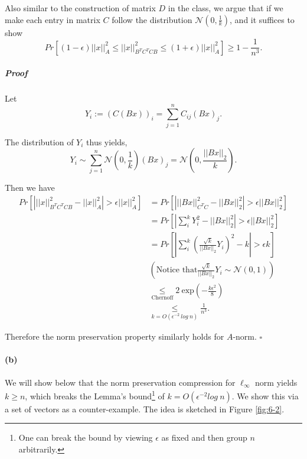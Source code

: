 \documentclass[12pt]{article}
\begin{document}
Also similar to the construction of matrix $D$ in the class, we argue that if we make each entry in matrix $C$ follow the distribution $\mathcal{N}(0, \frac{1}{k})$, and it suffices to show
\begin{equation*}
Pr\left[(1-\epsilon) ||x||^2_A \leq ||x||^2_{B^TC^TCB} \leq (1+\epsilon) ||x||^2_A\right] \geq 1 - \frac{1}{n^3}.
\end{equation*}

\subparagraph{Proof}
Let
\begin{equation*}
Y_i := \left(C(Bx)\right)_i = \sum_{j=1}^n C_{ij} (Bx)_j. 
\end{equation*}

The distribution of $Y_i$ thus yields,
\begin{equation*}
Y_i \sim \sum_{j=1}^n \mathcal{N}(0, \frac{1}{k}) (Bx)_j = \mathcal{N}(0, \frac{||Bx||_2}{k}). 
\end{equation*}

Then we have
\begin{align*}
Pr\left[\left|||x||^2_{B^TC^TCB} - ||x||^2_A\right| > \epsilon ||x||^2_A\right] &= Pr\left[\left|||Bx||^2_{C^TC} - ||Bx||^2_2\right| > \epsilon ||Bx||^2_2\right] \\
&= Pr\left[\left|\sum_i^k Y_i^2 - ||Bx||_2^2\right| > \epsilon ||Bx||^2_2\right] \\
&= Pr\left[\left|\sum_i^k \left(\frac{\sqrt{k}}{||Bx||_2}Y_i\right)^2 - k\right| > \epsilon k\right]\\
&\left(\text{Notice that} \frac{\sqrt{k}}{||Bx||_2}Y_i \sim \mathcal{N}(0,1)\right)\\
&\underset{{\text{Chernoff}}}{\leq} 2\:\text{exp}\left(-\frac{k\epsilon^2}{8}\right) \\
&\underset{{k = O(\epsilon^{-2}\:log\:n)}}{\leq} \frac{1}{n^3}.
\end{align*}

Therefore the norm preservation property similarly holds for $A$-norm. $\square$
\paragraph{(b)} We will show below that the norm preservation compression for $\ell_\infty$ norm yields $k \geq n$, which breaks the Lemma's bound\footnote{One can break the bound by viewing $\epsilon$ as fixed and then group $n$ arbitrarily.} of $k = O(\epsilon^{-2}log\:n)$. We show this via a set of vectors as a counter-example. The idea is sketched in Figure \ref{fig:6-2}.
\end{document}
